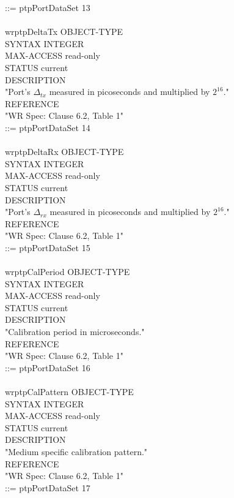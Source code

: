 ::= { ptpPortDataSet 13 } \\
\\
wrptpDeltaTx OBJECT-TYPE  \\
SYNTAX INTEGER \\
MAX-ACCESS read-only \\
STATUS current \\
DESCRIPTION \\
"Port's $\Delta_{tx}$ measured in picoseconds and multiplied by $2^{16}$." \\
REFERENCE \\
"WR Spec: Clause 6.2, Table 1" \\
::= { ptpPortDataSet 14 } \\
\\
wrptpDeltaRx OBJECT-TYPE \\
SYNTAX INTEGER \\
MAX-ACCESS read-only \\
STATUS current \\
DESCRIPTION \\
"Port's $\Delta_{rx}$ measured in picoseconds and multiplied by $2^{16}$." \\
REFERENCE \\
"WR Spec: Clause 6.2, Table 1" \\
::= { ptpPortDataSet 15 } \\
\\
wrptpCalPeriod OBJECT-TYPE \\
SYNTAX INTEGER \\
MAX-ACCESS read-only \\
STATUS current \\
DESCRIPTION \\
"Calibration period in microseconds." \\
REFERENCE \\
"WR Spec: Clause 6.2, Table 1" \\
::= { ptpPortDataSet 16 } \\
\\
wrptpCalPattern OBJECT-TYPE \\
SYNTAX INTEGER \\
MAX-ACCESS read-only \\
STATUS current \\
DESCRIPTION \\
"Medium specific calibration pattern." \\
REFERENCE \\
"WR Spec: Clause 6.2, Table 1" \\
::= { ptpPortDataSet 17 } \\
